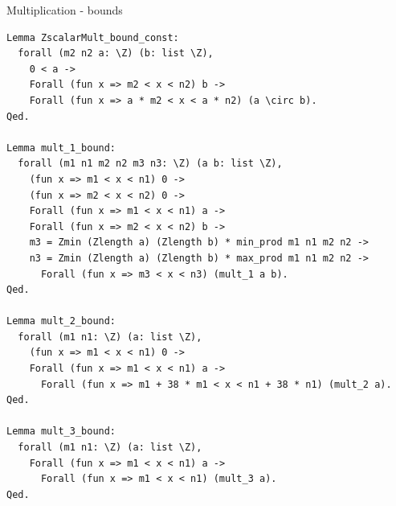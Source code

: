 \documentclass[8pt]{beamer}
\begin{document}
%
%





%
%

\begin{frame}[fragile]{Multiplication - bounds}
  \begin{center}
\begin{lstlisting}[language=CoqD, caption=Multiplication | Proofs of bounds, label=cod:languageC131]
Lemma ZscalarMult_bound_const:
  forall (m2 n2 a: \Z) (b: list \Z),
    0 < a ->
    Forall (fun x => m2 < x < n2) b ->
    Forall (fun x => a * m2 < x < a * n2) (a \circ b).
Qed.

Lemma mult_1_bound:
  forall (m1 n1 m2 n2 m3 n3: \Z) (a b: list \Z),
    (fun x => m1 < x < n1) 0 ->
    (fun x => m2 < x < n2) 0 ->
    Forall (fun x => m1 < x < n1) a ->
    Forall (fun x => m2 < x < n2) b ->
    m3 = Zmin (Zlength a) (Zlength b) * min_prod m1 n1 m2 n2 ->
    n3 = Zmin (Zlength a) (Zlength b) * max_prod m1 n1 m2 n2 ->
      Forall (fun x => m3 < x < n3) (mult_1 a b).
Qed.

Lemma mult_2_bound:
  forall (m1 n1: \Z) (a: list \Z),
    (fun x => m1 < x < n1) 0 ->
    Forall (fun x => m1 < x < n1) a ->
      Forall (fun x => m1 + 38 * m1 < x < n1 + 38 * n1) (mult_2 a).
Qed.

Lemma mult_3_bound:
  forall (m1 n1: \Z) (a: list \Z),
    Forall (fun x => m1 < x < n1) a ->
      Forall (fun x => m1 < x < n1) (mult_3 a).
Qed.
\end{lstlisting}

  \end{center}
\end{frame}
\end{document}
